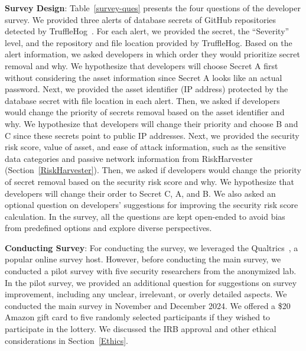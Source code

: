 \textbf{Survey Design}: Table~\ref{survey-ques} presents the four questions of the developer survey. We provided three alerts of database secrets of GitHub repositories detected by TruffleHog~\cite{trufflehog}. For each alert, we provided the secret, the ``Severity'' level, and the repository and file location provided by TruffleHog. Based on the alert information, we asked developers in which order they would prioritize secret removal and why. We hypothesize that developers will choose Secret A first without considering the asset information since Secret A looks like an actual password. Next, we provided the asset identifier (IP address) protected by the database secret with file location in each alert. Then, we asked if developers would change the priority of secrets removal based on the asset identifier and why. We hypothesize that developers will change their priority and choose B and C since these secrets point to public IP addresses. Next, we provided the security risk score, value of asset, and ease of attack information, such as the sensitive data categories and passive network information from RiskHarvester (Section~\ref{RiskHarvester}). Then, we asked if developers would change the priority of secret removal based on the security risk score and why. We hypothesize that developers will change their order to Secret C, A, and B. We also asked an optional question on developers' suggestions for improving the security risk score calculation. In the survey, all the questions are kept open-ended to avoid bias from predefined options and explore diverse perspectives.

\textbf{Conducting Survey}: For conducting the survey, we leveraged the Qualtrics~\cite{qualtrics}, a popular online survey host. However, before conducting the main survey, we conducted a pilot survey with five security researchers from the anonymized lab. In the pilot survey, we provided an additional question for suggestions on survey improvement, including any unclear, irrelevant, or overly detailed aspects. We conducted the main survey in November and December 2024. We offered a \$20 Amazon gift card to five randomly selected participants if they wished to participate in the lottery. We discussed the IRB approval and other ethical considerations in Section~\ref{Ethics}.